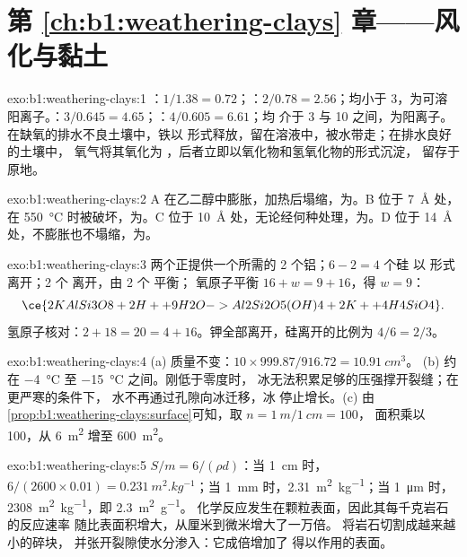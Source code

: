 \section*{第 \ref{ch:b1:weathering-clays} 章——风化与黏土}

\begin{solution}{exo:b1:weathering-clays:1}
：$1/1.38 = 0.72$；：$2/0.78 = 2.56$；均小于 3，为可溶
阳离子。：$3/0.645 = 4.65$；：$4/0.605 = 6.61$；均
介于 3 与 10 之间，为阳离子。在缺氧的排水不良土壤中，铁以
 形式释放，留在溶液中，被水带走；在排水良好的土壤中，
氧气将其氧化为 ，后者立即以氧化物和氢氧化物的形式沉淀，
留存于原地。
\end{solution}

\begin{solution}{exo:b1:weathering-clays:2}
A 在乙二醇中膨胀，加热后塌缩，为。B 位于
\SI{7}{\angstrom} 处，在 \SI{550}{\celsius} 时被破坏，为。C 位于
\SI{10}{\angstrom} 处，无论经何种处理，为。D 位于 \SI{14}{\angstrom}
处，不膨胀也不塌缩，为。
\end{solution}

\begin{solution}{exo:b1:weathering-clays:3}
两个正提供一个所需的 2 个铝；$6 - 2 = 4$ 个硅
以  形式离开；2 个  离开，由 2 个  平衡；
氧原子平衡 $16 + w = 9 + 16$，得 $w = 9$：
\[
  \ce{2 KAlSi3O8 + 2 H+ + 9 H2O -> Al2Si2O5(OH)4 + 2 K+ + 4 H4SiO4}.
\]
氢原子核对：$2 + 18 = 20 = 4 + 16$。钾全部离开，硅离开的比例为 $4/6 =
2/3$。
\end{solution}

\begin{solution}{exo:b1:weathering-clays:4}
(a) 质量不变：$10 \times 999.87/916.72 = \qty{10.91}{cm^3}$。
(b) 约在 \qty{-4}{\celsius} 至 \qty{-15}{\celsius} 之间。刚低于零度时，
冰无法积累足够的压强撑开裂缝；在更严寒的条件下，
水不再通过孔隙向冰迁移，冰
停止增长。(c) 由
\cref{prop:b1:weathering-clays:surface}可知，取 $n = \qty{1}{m}/\qty{1}{cm} = 100$，
面积乘以 100，从 \qty{6}{m^2} 增至 \qty{600}{m^2}。
\end{solution}

\begin{solution}{exo:b1:weathering-clays:5}
$S/m = 6/(\rho d)$：当 \qty{1}{cm} 时，$6/(2600\times0.01) =
\qty{0.231}{m^2.kg^{-1}}$；当 \qty{1}{mm} 时，\qty{2.31}{m^2.kg^{-1}}；当
\qty{1}{\micro m} 时，\qty{2308}{m^2.kg^{-1}}，即 \qty{2.3}{m^2.g^{-1}}。
化学反应发生在颗粒表面，因此其每千克岩石的反应速率
随比表面积增大，从厘米到微米增大了一万倍。
将岩石切割成越来越小的碎块，
并张开裂隙使水分渗入：它成倍增加了
得以作用的表面。
\end{solution}

